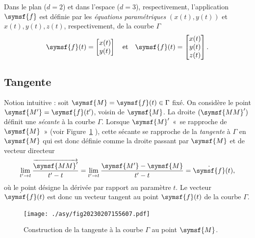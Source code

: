 \documentclass[
  a4paper,
  DIV=11,
  numbers=noendperiod]{scrreprt}
\newcommand{\altvec}[1]{\overrightarrow{#1}}
\newcommand{\point}[1]{\symsf{#1}}
\begin{document}
\begin{tcolorbox}[enhanced jigsaw, toptitle=1mm, title=\textcolor{quarto-callout-note-color}{\faInfo}\hspace{0.5em}{Note}, colbacktitle=quarto-callout-note-color!10!white, toprule=.15mm, left=2mm, bottomrule=.15mm, arc=.35mm, breakable, opacityback=0, colframe=quarto-callout-note-color-frame, bottomtitle=1mm, titlerule=0mm, leftrule=.75mm, opacitybacktitle=0.6, coltitle=black, rightrule=.15mm, colback=white]

Dans le plan (\(d = 2\)) et dans l'espace (\(d = 3\)), respectivement,
l'application \(\point{f}\) est définie par les \emph{équations
paramétriques} \((x(t), y(t))\) et \(x(t), y(t), z(t)\), respectivement,
de la courbe \(\Gamma\) \[
\point{f}(t) = \begin{bmatrix} x(t) \\ y(t) \end{bmatrix}
\quad \text{et} \quad
\point{f}(t) = \begin{bmatrix} x(t) \\ y(t) \\ z(t) \end{bmatrix}.
\]

\end{tcolorbox}

\hypertarget{tangente}{%
\subsection{Tangente}\label{tangente}}

Notion intuitive : soit \(\point{M} = \point{f}(t) \in \Gamma\) fixé. On
considère le point \(\point{M'} = \point{f}(t')\), voisin de
\(\point{M}\). La droite \((\point{MM}')\) définit une \emph{sécante} à
la courbe \(\Gamma\). Lorsque \(\point{M}'\) «~se rapproche de
\(\point{M}\)~» (voir Figure~\ref{fig-20230207155607} ), cette sécante
se rapproche de la \emph{tangente} à \(\Gamma\) en \(\point{M}\) qui est
donc définie comme la droite passant par \(\point{M}\) et de vecteur
directeur \[
\lim_{t' \to t} \frac{\altvec{\point{MM}'}}{t' - t} = \lim_{t' \to t} \frac{\point{M'} - \point{M}}{t' - t} = \dot{\point{f}}(t),
\] où le point désigne la dérivée par rapport au paramètre \(t\). Le
vecteur \(\dot{\point{f}}(t)\) est donc un vecteur tangent au point
\(\point{f}(t)\) de la courbe \(\Gamma\).

\begin{figure}

{\centering \texttt{[image: ./asy/fig20230207155607.pdf]}

}

\caption{\label{fig-20230207155607}Construction de la tangente à la
courbe \(\Gamma\) au point \(\point{M}\).}

\end{figure}
\end{document}
